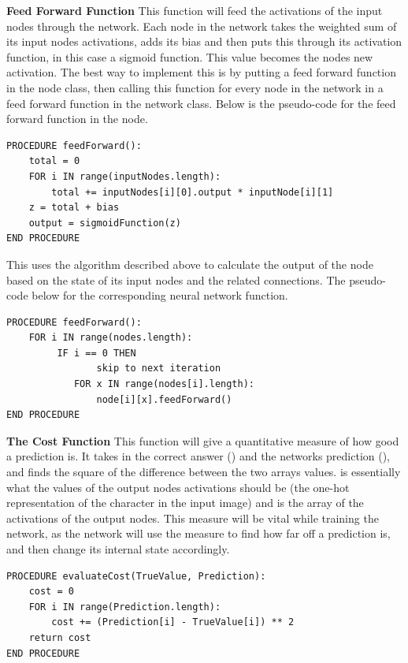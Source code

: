 \documentclass{report}
\begin{document}
\newpage
\noindent\textbf{Feed Forward Function}
\newline
This function will feed the activations of the input nodes through the network. Each node in the network takes the weighted sum of its input nodes activations, adds its bias and then puts this through its activation function, in this case a sigmoid function. This value becomes the nodes new activation.
\newline
The best way to implement this is by putting a feed forward function in the node class, then calling this function for every node in the network in a feed forward function in the network class. Below is the pseudo-code for the feed forward function in the node.
\begin{verbatim}
PROCEDURE feedForward():
    total = 0
    FOR i IN range(inputNodes.length):
        total += inputNodes[i][0].output * inputNode[i][1]
    z = total + bias
    output = sigmoidFunction(z)
END PROCEDURE
\end{verbatim}
This uses the algorithm described above to calculate the output of the node based on the state of its input nodes and the related connections. The pseudo-code below for the corresponding neural network function.
\begin{verbatim}
PROCEDURE feedForward():
    FOR i IN range(nodes.length):
         IF i == 0 THEN
                skip to next iteration
            FOR x IN range(nodes[i].length):
                node[i][x].feedForward()
END PROCEDURE
\end{verbatim}

\noindent\textbf{The Cost Function}
\newline
This function will give a quantitative measure of how good a prediction is. It takes in the correct answer () and the networks prediction (), and finds the square of the difference between the two arrays values.  is essentially what the values of the output nodes activations should be (the one-hot representation of the character in the input image) and  is the array of the activations of the output nodes.
\newline
This measure will be vital while training the network, as the network will use the measure to find how far off a prediction is, and then change its internal state accordingly.
\begin{verbatim}
PROCEDURE evaluateCost(TrueValue, Prediction):
    cost = 0
    FOR i IN range(Prediction.length):
        cost += (Prediction[i] - TrueValue[i]) ** 2
    return cost
END PROCEDURE
\end{verbatim}
\newpage
\end{document}
